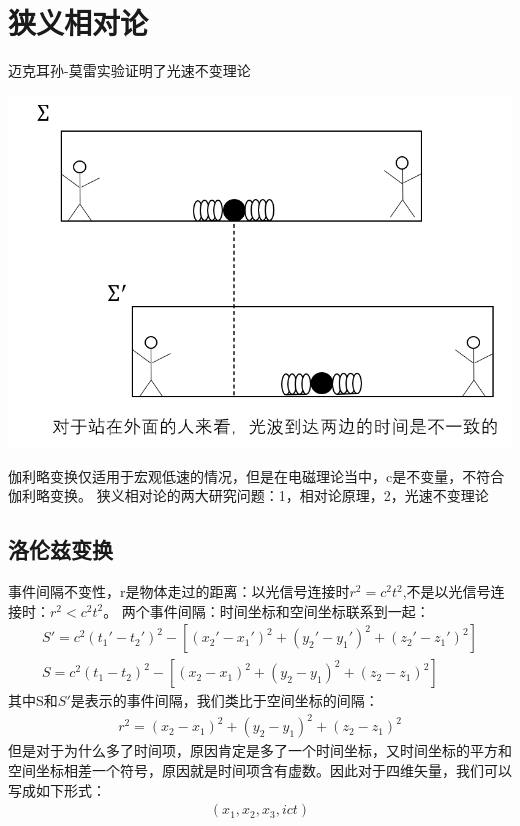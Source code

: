 \documentclass[UTF8]{article}
\begin{document}
\section{狭义相对论}
迈克耳孙-莫雷实验证明了光速不变理论
\begin{center}
    \includegraphics[scale=0.7]{img/xiaxiang.png}
\end{center}
伽利略变换仅适用于宏观低速的情况，但是在电磁理论当中，c是不变量，不符合伽利略变换。
狭义相对论的两大研究问题：1，相对论原理，2，光速不变理论
\subsection{洛伦兹变换}
事件间隔不变性，r是物体走过的距离：以光信号连接时$r^2=c^2t^2$,不是以光信号连接时：$r^2<c^2t^2$。
两个事件间隔：时间坐标和空间坐标联系到一起：
\begin{align*}
    S'=c^2(t_1'-t_2')^2-[(x_2'-x_1')^2+(y_2'-y_1')^2+(z_2'-z_1')^2] \\
    S=c^2(t_1-t_2)^2-[(x_2-x_1)^2+(y_2-y_1)^2+(z_2-z_1)^2]
\end{align*}
其中S和$S'$是表示的事件间隔，我们类比于空间坐标的间隔：
\begin{align*}
    r^2=(x_2-x_1)^2+(y_2-y_1)^2+(z_2-z_1)^2
\end{align*}
但是对于为什么多了时间项，原因肯定是多了一个时间坐标，又时间坐标的平方和空间坐标相差一个符号，原因就是时间项含有虚数。因此对于四维矢量，我们可以写成如下形式：
\begin{align*}
    (x_1,x_2,x_3,ict)
\end{align*}
\end{document}
